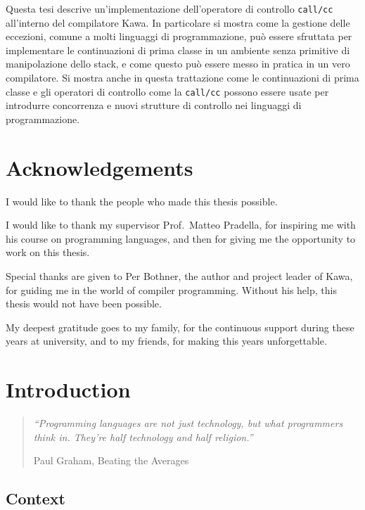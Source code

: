 \documentclass[12pt,a4paper,oneside,openright]{book}
\newcommand\blankpage{%
    \null
    \thispagestyle{empty}%
    \addtocounter{page}{-1}%
    \newpage}
\begin{document}
Questa tesi descrive un'implementazione dell'operatore di controllo
\texttt{call/cc} all'interno del compilatore Kawa. In particolare si
mostra come la gestione delle eccezioni, comune a molti linguaggi di
programmazione, può essere sfruttata per implementare le continuazioni
di prima classe in un ambiente senza primitive di manipolazione dello
stack, e come questo può essere messo in pratica in un vero compilatore.
Si mostra anche in questa trattazione come le continuazioni di prima
classe e gli operatori di controllo come la \texttt{call/cc} possono
essere usate per introdurre concorrenza e nuovi strutture di controllo
nei linguaggi di programmazione.

\chapter{Acknowledgements}

I would like to thank the people who made this thesis possible.

I would like to thank my supervisor Prof.~Matteo Pradella, for inspiring
me with his course on programming languages, and then for giving me the
opportunity to work on this thesis.

Special thanks are given to Per Bothner, the author and project leader
of Kawa, for guiding me in the world of compiler programming. Without
his help, this thesis would not have been possible.

My deepest gratitude goes to my family, for the continuous support
during these years at university, and to my friends, for making this
years unforgettable.

\afterpage{\blankpage}

\tableofcontents
\listoffigures

\mainmatter

\chapter{Introduction}\label{introduction}

\begin{quote}
\emph{``Programming languages are not just technology, but what
programmers think in. They're half technology and half religion.''}

\begin{flushright}
Paul Graham, Beating the Averages
\end{flushright}
\end{quote}

\section{Context}\label{context}
\end{document}

